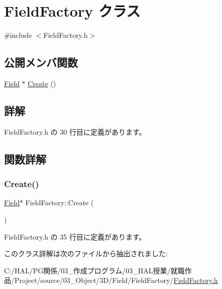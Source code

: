 \hypertarget{class_field_factory}{}\section{Field\+Factory クラス}
\label{class_field_factory}


{\ttfamily \#include $<$Field\+Factory.\+h$>$}

\subsection*{公開メンバ関数}
\begin{DoxyCompactItemize}
\item 
\mbox{\hyperlink{class_field}{Field}} $\ast$ \mbox{\hyperlink{class_field_factory_a7e2a9847756bbb43f9942a219cc69125}{Create}} ()
\end{DoxyCompactItemize}


\subsection{詳解}


 Field\+Factory.\+h の 30 行目に定義があります。



\subsection{関数詳解}
\mbox{\label{class_field_factory_a7e2a9847756bbb43f9942a219cc69125}} 
\subsubsection{\texorpdfstring{Create()}{Create()}}
{\footnotesize\ttfamily \mbox{\hyperlink{class_field}{Field}}$\ast$ Field\+Factory\+::\+Create (\begin{DoxyParamCaption}{ }\end{DoxyParamCaption})\hspace{0.3cm}{\ttfamily [inline]}}



 Field\+Factory.\+h の 35 行目に定義があります。



このクラス詳解は次のファイルから抽出されました\+:\begin{DoxyCompactItemize}
\item 
C\+:/\+H\+A\+L/\+P\+G関係/03\+\_\+作成プログラム/03\+\_\+\+H\+A\+L授業/就職作品/\+Project/source/03\+\_\+\+Object/3\+D/\+Field/\+Field\+Factory/\mbox{\hyperlink{_field_factory_8h}{Field\+Factory.\+h}}\end{DoxyCompactItemize}
